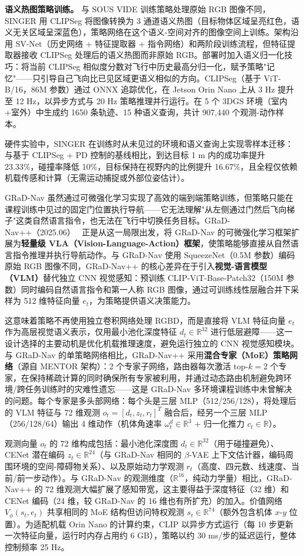 \textbf{语义热图策略训练。}
与 SOUS VIDE 训练策略处理原始 RGB 图像不同，SINGER 用 CLIPSeg 将图像转换为 3 通道语义热图（目标物体区域呈亮红色，语义无关区域呈深蓝色），策略网络在这个语义-空间对齐的图像空间上训练。架构沿用 SV-Net（历史网络 + 特征提取器 + 指令网络）和两阶段训练流程，但特征提取器接收 CLIPSeg 处理后的语义热图而非原始 RGB。部署时加入语义归一化技巧：将当前 CLIPSeg 相似度分数对飞行中历史最高分归一化，赋予策略"记忆"——只引导自己飞向比已见区域更语义相似的方向。CLIPSeg（基于 ViT-B/16，86M 参数）通过 ONNX 追踪优化，在 Jetson Orin Nano 上从 3 Hz 提升至 12 Hz，以异步方式与 20 Hz 策略推理并行运行。在 5 个 3DGS 环境（室内+室外）中生成约 1650 条轨迹、15 种语义查询，共计 907,440 个观测-动作样本。

硬件实验中，SINGER 在训练时从未见过的环境和语义查询上实现零样本迁移：与基于 CLIPSeg + PD 控制的基线相比，到达目标 1 m 内的成功率提升 23.33\%，碰撞率降低 10\%，目标保持在视野内的比例提升 16.67\%，且全程仅依赖机载传感和计算（无需运动捕捉或外部位姿估计）。

GRaD-Nav 虽然通过可微强化学习实现了高效的端到端策略训练，但策略只能在课程训练中见过的固定门位置执行导航——它无法理解"从左侧通过门然后飞向梯子"这类自然语言指令，也无法在飞行中切换任务目标。GRaD-Nav++（2025.06）~\cite{2506_14009} 正是从这一局限出发，将 GRaD-Nav 的可微强化学习框架扩展为\textbf{轻量级 VLA（Vision-Language-Action）框架}，使策略能够直接从自然语言指令推理并执行导航动作。与 GRaD-Nav 使用 SqueezeNet（0.5M 参数）编码原始 RGB 图像不同，GRaD-Nav++ 的核心差异在于引入\textbf{视觉-语言模型（VLM）}替代独立 CNN 视觉感知：预训练 CLIP-ViT-Base-Patch32（150M 参数）同时编码自然语言指令和第一人称 RGB 图像，通过可训练线性层融合并下采样为 512 维特征向量 $e_t$，为策略提供语义决策能力。

这意味着策略不再使用独立卷积网络处理 RGBD，而是直接将 VLM 特征向量 $e_t$ 作为高层视觉语义表示，仅用最小池化深度特征 $d_t \in \mathbb{R}^{32}$ 进行低层避障——这一设计选择的主要动机是优化机载推理速度，避免运行独立的 CNN 视觉感知模块。与 GRaD-Nav 的单策略网络相比，GRaD-Nav++ 采用\textbf{混合专家（MoE）策略网络}（源自 MENTOR 架构）：2 个专家子网络，路由器每次激活 top-$k=2$ 个专家，在保持稀疏计算的同时确保所有专家被利用，并通过动态路由机制避免跨环境/跨任务训练时的灾难性遗忘——这是 GRaD-Nav 多环境课程训练中未曾解决的问题。每个专家是多头部网络：每个头是三层 MLP（512/256/128），将处理后的 VLM 特征与 72 维观测 $o_t = [d_t, z_t, r_t]^T$ 融合后，经另一个三层 MLP（256/128/64）输出 4 维动作（机体角速率 $\omega^d_t \in \mathbb{R}^3$ + 归一化推力 $c_t \in \mathbb{R}$）。

观测向量 $o_t$ 的 72 维构成包括：最小池化深度图 $d_t \in \mathbb{R}^{32}$（用于碰撞避免）、CENet 潜在编码 $z_t \in \mathbb{R}^{24}$（与 GRaD-Nav 相同的 $\beta$-VAE 上下文估计器，编码周围环境的空间-障碍物关系）、以及原始动力学观测 $r_t$（高度、四元数、线速度、当前/前一步动作）。与 GRaD-Nav 的观测维度（$\mathbb{R}^{16}$，纯动力学量）相比，GRaD-Nav++ 的 72 维观测大幅扩展了感知带宽，这主要得益于深度特征（32 维）和 CENet 编码（24 维，较 GRaD-Nav 的 16 维也有所扩充）的加入。价值网络 $V_\phi(s_t, e_t)$ 共享相同的 MoE 结构但访问特权观测 $s_t \in \mathbb{R}^{74}$（额外包含机体 $x$-$y$ 位置）。为适配机载 Orin Nano 的计算约束，CLIP 以异步方式运行（每 10 步更新一次特征向量，运行时内存占用约 6 GB），策略以约 30 ms/步的延迟运行，整体控制频率 25 Hz。

